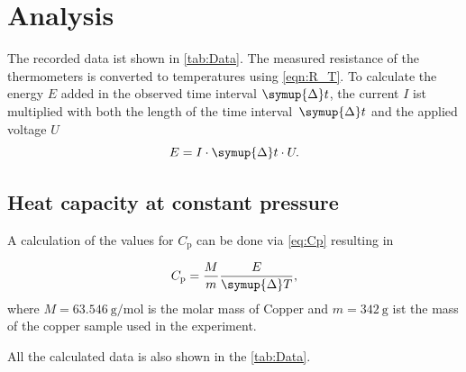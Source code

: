 \section{Analysis}
\label{sec:Analysis}

The recorded data ist shown in \autoref{tab:Data}. The measured resistance of the thermometers is converted to temperatures using \autoref{eqn:R_T}.
To calculate the energy $E$ added in the observed time interval $\symup{\Delta}t$, the current $I$ ist multiplied with both the length of the time 
interval~$\symup{\Delta}t$ and the applied voltage $U$
\begin{equation}
  E = I \cdot \symup{\Delta}t \cdot U.
  \label{eq:added_E}
\end{equation}

\subsection{Heat capacity at constant pressure}
\label{subsec:Heat capacity at constant volume}
A calculation of the values for $C_\mathrm{p}$ can be done via \autoref{eq:Cp} resulting in

\begin{equation}
  C_\mathrm{p} = \frac{M}{m} \frac{E}{\symup{\Delta}T},
  \label{eq:C_P_calc}
\end{equation}
where $M=\qty{63.546}{\gram\per\mol}$ is the molar mass of Copper and $m=\qty{342}{\gram}$ ist the mass of the copper sample used in the
experiment. 

All the calculated data is also shown in the \autoref{tab:Data}.

